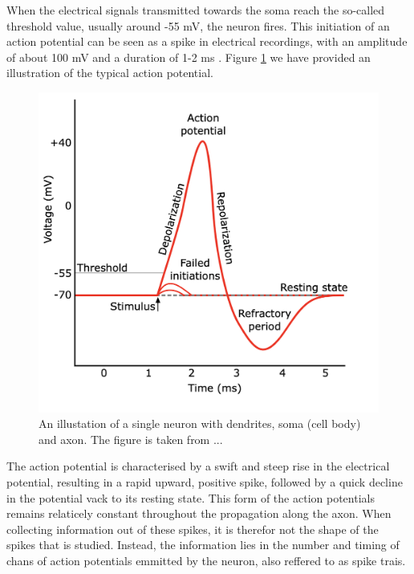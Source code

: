 \documentclass[a4paper, UKenglish, 11pt]{uiomaster}
\begin{document}
When the electrical signals transmitted towards the soma reach the so-called threshold value, usually around -55 mV, the neuron fires. This initiation of an action potential can be seen as a spike in electrical recordings, with an amplitude of about 100 mV and a duration of 1-2 ms \cite{gerstner2014neuronal}. Figure \ref{fig:action_potential} we have provided an illustration of the typical action potential.


\begin{figure}
    \centering
    \includegraphics[width=\linewidth]{figures/action_potential.png}
    \caption{An illustation of a single neuron with dendrites, soma (cell body) and axon. The figure is taken from ...}
    \label{fig:action_potential}
\end{figure}

The action potential is characterised by a swift and steep rise in the electrical potential, resulting in a rapid upward, positive spike, followed by a quick decline in the potential vack to its resting state. This form of the action potentials remains relaticely constant throughout the propagation along the axon. When collecting information out of these spikes, it is therefor not the shape of the spikes that is studied. Instead, the information lies in the number and timing of chans of action potentials emmitted by the neuron, also reffered to as spike trais.
\end{document}

